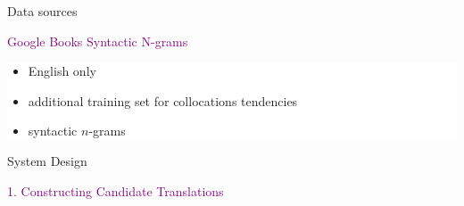 \documentclass[final,t]{beamer}
\begin{document}
\begin{frame}{}
\begin{columns}[t]
\begin{column}{.47\linewidth}
\begin{block}{Data sources}
\begin{center}
\textcolor{purple}{Google Books Syntactic N-grams}
\end{center}

\colorbox{white}{
\begin{minipage}{.85\linewidth}
\begin{itemize}
\item English only
\item additional training set for collocations tendencies
\item syntactic $n$-grams 

\end{itemize}
\end{minipage}
}

\end{block}




\vspace{3ex}

\begin{block}{System Design}

\begin{center}
  \textcolor{purple}{1. Constructing Candidate Translations}
 \end{center}


\end{block}
\end{column}
\end{columns}
\end{frame}
\end{document}
